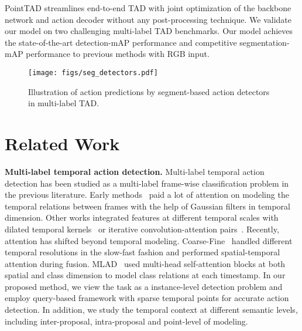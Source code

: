 \documentclass{article}
\renewcommand{\paragraph}[1]{\vspace{1.25mm}\noindent\textbf{#1}}
\begin{document}
PointTAD streamlines end-to-end TAD with joint optimization of the backbone network and action decoder without any post-processing technique. We validate our model on two challenging multi-label TAD benchmarks. Our model achieves the state-of-the-art detection-mAP performance and competitive segmentation-mAP performance to previous methods with RGB input.

\begin{figure}
  \centering
  \vspace{-2mm}
  \texttt{[image: figs/seg\_detectors.pdf]}
  \caption{Illustration of action predictions by segment-based action detectors in multi-label TAD.} 
  \label{fig:segment}
  \vspace{-3mm}
\end{figure}

\section{Related Work}
\paragraph{Multi-label temporal action detection.}  
Multi-label temporal action detection has been studied as a multi-label frame-wise classification problem in the previous literature. Early methods~\cite{DBLP:conf/cvpr/PiergiovanniR18, DBLP:conf/icml/PiergiovanniR19} paid a lot of attention on modeling the temporal relations between frames with the help of Gaussian filters in temporal dimension. Other works integrated features at different temporal scales with dilated temporal kernels~\cite{DBLP:conf/wacv/DaiDMGFB21} or iterative convolution-attention pairs~\cite{DBLP:conf/cvpr/DaiDKRB22}. Recently, attention has shifted beyond temporal modeling. Coarse-Fine~\cite{DBLP:conf/cvpr/KahatapitiyaR21} handled different temporal resolutions in the slow-fast fashion and performed spatial-temporal attention during fusion. 
MLAD~\cite{DBLP:conf/cvpr/TirupatturDRS21} used multi-head self-attention blocks at both spatial and class dimension to model class relations at each timestamp. In our proposed method, we view the task as a instance-level detection problem and employ query-based framework with sparse temporal points for accurate action detection. In addition, we study the temporal context at different semantic levels, including inter-proposal, intra-proposal and point-level of modeling.
\end{document}
